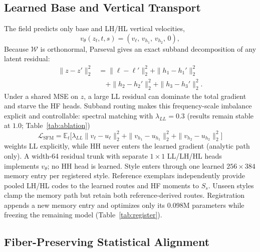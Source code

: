 \documentclass[letterpaper]{article} %
\begin{document}
\subsection{Learned Base and Vertical Transport}
\label{sec:sfm}

The field predicts only base and LH/HL vertical velocities,
\begin{equation}
v_\theta(z_t,t,s)=(v_\ell,\,v_{h_1},\,v_{h_2},\,0),
\label{eq:velocity-split}
\end{equation}
Because $\mathcal W$ is orthonormal, Parseval gives an exact subband decomposition of any
latent residual:
\begin{equation}
\begin{aligned}
\|z{-}z'\|_2^2
&=\|\ell{-}\ell'\|_2^2
+\|h_1{-}h_1'\|_2^2 \\
&\quad+\|h_2{-}h_2'\|_2^2
+\|h_3{-}h_3'\|_2^2.
\end{aligned}
\label{eq:parseval}
\end{equation}
Under a shared MSE on $z$, a large LL residual can dominate the total
gradient and starve the HF heads. Subband routing makes this
frequency-scale imbalance explicit and controllable: spectral matching
with $\lambda_{LL}{=}0.3$ (results remain stable at $1.0$; Table~\ref{tab:ablation})
\begin{equation}
\mathcal L_{\mathrm{SFM}}
=\mathbb E_t\big[
\lambda_{LL}\|v_\ell-u_\ell\|_2^2
+\|v_{h_1}-u_{h_1}\|_2^2
+\|v_{h_2}-u_{h_2}\|_2^2\big]
\label{eq:weave-loss}
\end{equation}
weights LL explicitly, while HH never enters the learned gradient (analytic path only).
A width-64 residual trunk with separate $1{\times}1$ LL/LH/HL heads implements $v_\theta$;
no HH head is learned. Style enters through one learned $256\times384$ memory entry per registered style. Reference exemplars independently provide pooled LH/HL codes to the learned routes and HF moments to $S_s$. Unseen styles clamp the memory path but retain both reference-derived routes. Registration appends a new memory entry and optimizes only its 0.098M parameters while freezing the remaining model (Table~\ref{tab:register}).

\subsection{Fiber-Preserving Statistical Alignment}
\label{sec:eota}
\end{document}
